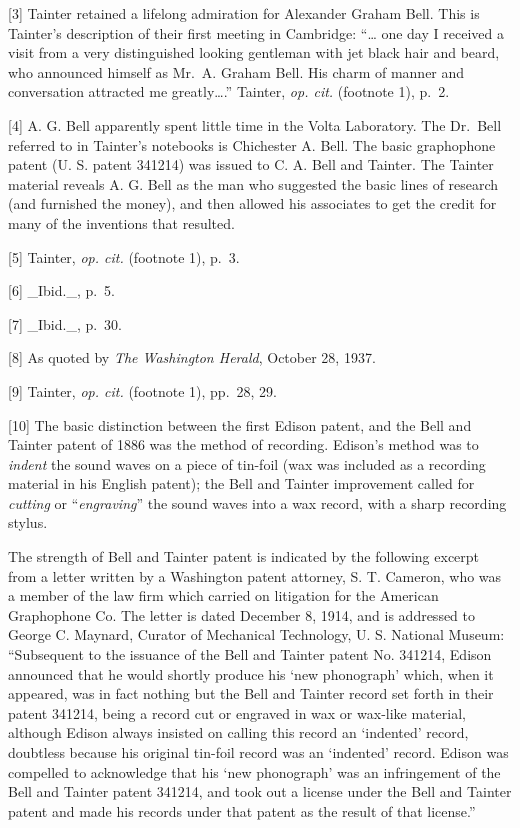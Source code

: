 \documentclass[12pt,oneside]{scrbook}
\begin{document}
  {[}3{]} Tainter retained a lifelong admiration for Alexander Graham
  Bell. This is Tainter's description of their first meeting in Cambridge:
  ``\ldots{} one day I received a visit from a very distinguished looking
  gentleman with jet black hair and beard, who announced himself as Mr.~A.
  Graham Bell. His charm of manner and conversation attracted me
  greatly\ldots{}.'' Tainter, \emph{op. cit.} (footnote 1), p.~2.
  
  {[}4{]} A. G. Bell apparently spent little time in the Volta Laboratory.
  The Dr.~Bell referred to in Tainter's notebooks is Chichester A. Bell.
  The basic graphophone patent (U. S. patent 341214) was issued to C. A.
  Bell and Tainter. The Tainter material reveals A. G. Bell as the man who
  suggested the basic lines of research (and furnished the money), and
  then allowed his associates to get the credit for many of the inventions
  that resulted.
  
  {[}5{]} Tainter, \emph{op. cit.} (footnote 1), p.~3.
  
  {[}6{]} \_Ibid.\_, p.~5.
  
  {[}7{]} \_Ibid.\_, p.~30.
  
  {[}8{]} As quoted by \emph{The Washington Herald}, October 28, 1937.
  
  {[}9{]} Tainter, \emph{op. cit.} (footnote 1), pp.~28, 29.
  
  {[}10{]} The basic distinction between the first Edison patent, and the
  Bell and Tainter patent of 1886 was the method of recording. Edison's
  method was to \emph{indent} the sound waves on a piece of tin-foil (wax
  was included as a recording material in his English patent); the Bell
  and Tainter improvement called for \emph{cutting} or
  ``\emph{engraving}'' the sound waves into a wax record, with a sharp
  recording stylus.
  
  The strength of Bell and Tainter patent is indicated by the following
  excerpt from a letter written by a Washington patent attorney, S. T.
  Cameron, who was a member of the law firm which carried on litigation
  for the American Graphophone Co. The letter is dated December 8, 1914,
  and is addressed to George C. Maynard, Curator of Mechanical Technology,
  U. S. National Museum: ``Subsequent to the issuance of the Bell and
  Tainter patent No. 341214, Edison announced that he would shortly
  produce his `new phonograph' which, when it appeared, was in fact
  nothing but the Bell and Tainter record set forth in their patent
  341214, being a record cut or engraved in wax or wax-like material,
  although Edison always insisted on calling this record an `indented'
  record, doubtless because his original tin-foil record was an `indented'
  record. Edison was compelled to acknowledge that his `new phonograph'
  was an infringement of the Bell and Tainter patent 341214, and took out
  a license under the Bell and Tainter patent and made his records under
  that patent as the result of that license.''
  
\end{document}
